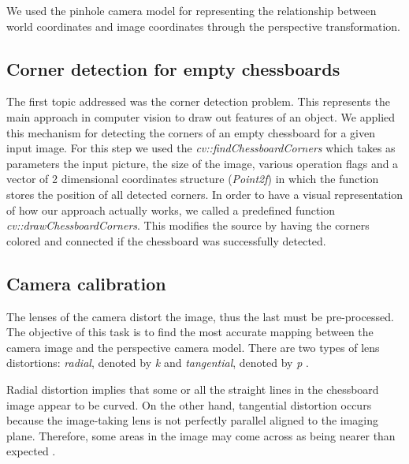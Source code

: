 \documentclass[conference]{IEEEtran}
\begin{document}





We used the pinhole camera model for representing the relationship between world coordinates and image coordinates through the perspective transformation.

\subsection{Corner detection for empty chessboards}
The first topic addressed was the corner detection problem. This represents the main approach in computer vision to draw out features of an object. We applied this mechanism for detecting the corners of an empty chessboard for a given input image. For this step we used the \emph{cv::findChessboardCorners} which takes as parameters the input picture, the size of the image, various operation flags and a vector of 2 dimensional coordinates structure (\emph{Point2f}) in which the function stores the position of all detected corners. In order to have a visual representation of how our approach actually works, we called a predefined function \emph{cv::drawChessboardCorners}. This modifies the source by having the corners colored and connected if the chessboard was successfully detected.

\subsection{Camera calibration}
The lenses of the camera distort the image, thus the last must be pre-processed. The objective of this task is to find the most accurate mapping between the camera image and the perspective camera model. There are two types of lens distortions: \emph{radial}, denoted by \emph{k} and \emph{tangential}, denoted by \emph{p} \cite{2020opencv}.  

Radial distortion implies that some or all the straight lines in the chessboard image appear to be curved. On the other hand, tangential distortion occurs because the image-taking lens is not perfectly parallel aligned to the imaging plane. Therefore, some areas in the image may come across as being nearer than expected \cite{2020opencv}.  
\end{document}
